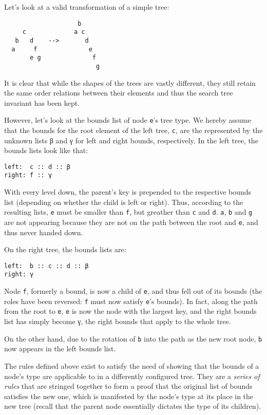\documentclass{scrartcl}
\begin{document}
Let's look at a valid transformation of a simple tree:

\begin{verbatim}
                    b
     c             a c
   b   d    -->       d
  a     f              e
       e g              f
                         g
\end{verbatim}

It is clear that while the shapes of the trees are vastly different, they
still retain the same order relations between their elements and thus
the search tree invariant has been kept.

However, let's look at the bounds list of node \verb/e/'s tree
type. We hereby assume that the bounds for the root element of the
left tree, \verb/c/, are the represented by the unknown lists β and γ
for left and right bounds, respectively. In the left tree, the bounds
lists look like that:

\begin{verbatim}
left:  c :: d :: β
right: f :: γ
\end{verbatim}

With every level down, the parent's key is prepended to the respective
bounds list (depending on whether the child is left or right). Thus,
according to the resulting lists, \verb/e/ must be smaller than
\verb/f/, but greather than \verb/c/ and \verb/d/. \verb/a/, \verb/b/
and \verb/g/ are not appearing because they are not on the path
between the root and \verb/e/, and thus never handed down.

On the right tree, the bounds lists are:

\begin{verbatim}
left:  b :: c :: d :: β
right: γ
\end{verbatim}

Node \verb/f/, formerly a bound, is now a child of \verb/e/, and thus
fell out of its bounds (the roles have been reversed: \verb/f/ must
now satisfy \verb/e/'s bounds). In fact, along the path from the root
to \verb/e/, \verb/e/ is now the node with the largest key, and the
right bounds list has simply become γ, the right bounds that apply to
the whole tree.

On the other hand, due to the rotation of \verb/b/ into the path as
the new root node, \verb/b/ now appears in the left bounds list.

The rules defined above exist to satisfy the need of showing that the
bounds of a node's type are applicable to in a differently configured
tree. They are a \emph{series of rules} that are stringed together to
form a proof that the original list of bounds satisfies the new one,
which is manifested by the node's type at its place in the new tree
(recall that the parent node essentially dictates the type of its
children).
\end{document}
